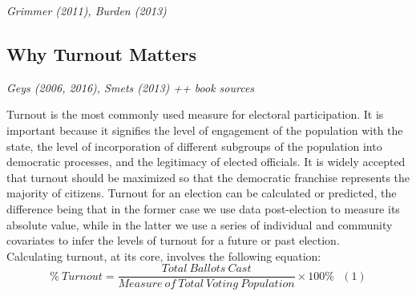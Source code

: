 \documentclass[12pt,twoside]{reedthesis}
\begin{document}
  \emph{Grimmer (2011), Burden (2013)}
  
  \subsection{Why Turnout Matters}\label{why-turnout-matters}
  
  \emph{Geys (2006, 2016), Smets (2013) ++ book sources}
  
  Turnout is the most commonly used measure for electoral participation.
  It is important because it signifies the level of engagement of the
  population with the state, the level of incorporation of different
  subgroups of the population into democratic processes, and the
  legitimacy of elected officials. It is widely accepted that turnout
  should be maximized so that the democratic franchise represents the
  majority of citizens. Turnout for an election can be calculated or
  predicted, the difference being that in the former case we use data
  post-election to measure its absolute value, while in the latter we use
  a series of individual and community covariates to infer the levels of
  turnout for a future or past election.\\
  Calculating turnout, at its core, involves the following equation:\\
  \[ \% ~Turnout = \frac{Total~Ballots~Cast}{Measure~of~Total~Voting~Population}\times100\%~~~(1)\]
  
\end{document}
